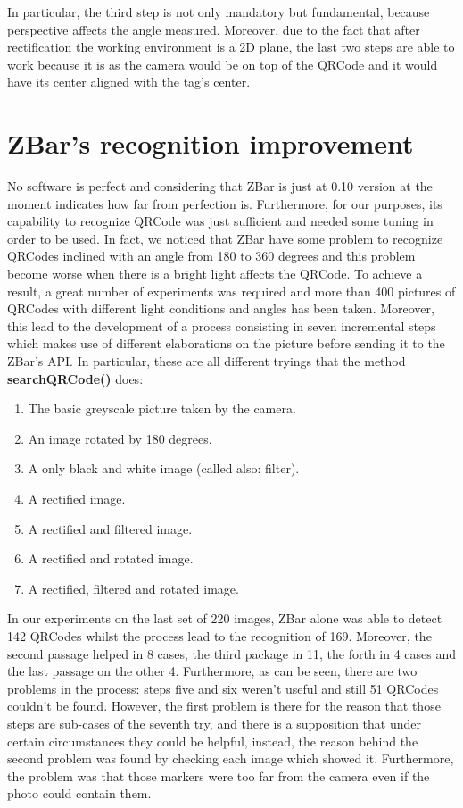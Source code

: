 In particular, the third step is not only mandatory but fundamental, because perspective affects the angle measured. Moreover, due to the fact that after rectification the working environment is a 2D plane, the last two steps are able to work because it is as the camera would be on top of the QRCode and it would have its center aligned with the tag's center.

\section{ZBar's recognition improvement} 
No software is perfect and considering that ZBar is just at 0.10 version at the moment indicates how far from perfection is. Furthermore, for our purposes, its capability to recognize QRCode was just sufficient and needed some tuning in order to be used. In fact, we noticed that ZBar have some problem to recognize QRCodes inclined with an angle from 180 to 360 degrees and this problem become worse when there is a bright light affects the QRCode. To achieve a result, a great number of experiments was required and more than 400 pictures of QRCodes with different light conditions and angles has been taken. Moreover, this lead to the development of a process consisting in seven incremental steps which makes use of different elaborations on the picture before sending it to the ZBar's API.
In particular, these are all different tryings that the method \textbf{searchQRCode()} does:

\begin{enumerate}
	\item The basic greyscale picture taken by the camera.
	\item An image rotated by 180 degrees.
	\item A only black and white image (called also: filter).
	\item A rectified image.
	\item A rectified and filtered image.
	\item A rectified and rotated image.
	\item A rectified, filtered and rotated image.
\end{enumerate}

In our experiments on the last set of 220 images, ZBar alone was able to detect 142 QRCodes whilst the process lead to the recognition of 169. Moreover, the second passage helped in 8 cases, the third package in 11, the forth in 4 cases and the last passage on the other 4. Furthermore, as can be seen, there are two problems in the process: steps five and six weren't useful and still 51 QRCodes couldn't be found. However, the first problem is there for the reason that those steps are sub-cases of the seventh try, and there is a supposition that under certain circumstances they could be helpful, instead, the reason behind the second problem was found by checking each image which showed it. Furthermore, the problem was that those markers were too far from the camera even if the photo could contain them.

